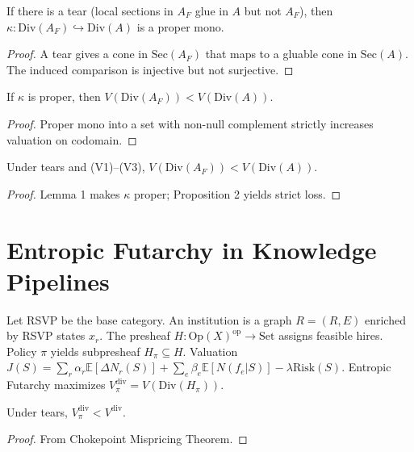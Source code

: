 \documentclass[12pt]{article}
\begin{document}
\begin{lemma}
If there is a tear (local sections in $A_F$ glue in $A$ but not $A_F$), then $\kappa: \mathrm{Div}(A_F) \hookrightarrow \mathrm{Div}(A)$ is a proper mono.
\end{lemma}

\begin{proof}
A tear gives a cone in $\mathrm{Sec}(A_F)$ that maps to a gluable cone in $\mathrm{Sec}(A)$. The induced comparison is injective but not surjective.
\end{proof}

\begin{proposition}
If $\kappa$ is proper, then $V(\mathrm{Div}(A_F)) < V(\mathrm{Div}(A))$.
\end{proposition}

\begin{proof}
Proper mono into a set with non-null complement strictly increases valuation on codomain.
\end{proof}

\begin{theorem}
Under tears and (V1)--(V3), $V(\mathrm{Div}(A_F)) < V(\mathrm{Div}(A))$.
\end{theorem}

\begin{proof}
Lemma 1 makes $\kappa$ proper; Proposition 2 yields strict loss.
\end{proof}

\section{Entropic Futarchy in Knowledge Pipelines}
\label{app:futarchy}
Let RSVP be the base category. An institution is a graph $R = (R, E)$ enriched by RSVP states $x_r$. The presheaf $H: \mathrm{Op}(X)^{\mathrm{op}} \to \mathrm{Set}$ assigns feasible hires. Policy $\pi$ yields subpresheaf $H_\pi \subseteq H$. Valuation $J(S) = \sum_r \alpha_r \mathbb{E}[\Delta N_r(S)] + \sum_e \beta_e \mathbb{E}[N(f_e|S)] - \lambda \mathrm{Risk}(S)$. Entropic Futarchy maximizes $V_\pi^{\mathrm{div}} = V(\mathrm{Div}(H_\pi))$.

\begin{theorem}
Under tears, $V_\pi^{\mathrm{div}} < V^{\mathrm{div}}$.
\end{theorem}

\begin{proof}
From Chokepoint Mispricing Theorem.
\end{proof}
\end{document}
